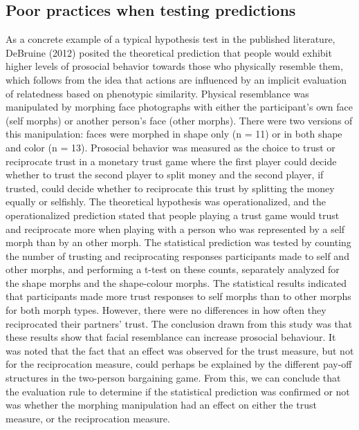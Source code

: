 \documentclass[doc,floatsintext]{apa6}
\begin{document}
\hypertarget{poor-practices-when-testing-predictions}{%
\subsection{Poor practices when testing predictions}\label{poor-practices-when-testing-predictions}}

As a concrete example of a typical hypothesis test in the published literature, DeBruine (2012) posited the theoretical prediction that people would exhibit higher levels of prosocial behavior towards those who physically resemble them, which follows from the idea that actions are influenced by an implicit evaluation of relatedness based on phenotypic similarity. Physical resemblance was manipulated by morphing face photographs with either the participant's own face (self morphs) or another person's face (other morphs). There were two versions of this manipulation: faces were morphed in shape only (n = 11) or in both shape and color (n = 13). Prosocial behavior was measured as the choice to trust or reciprocate trust in a monetary trust game where the first player could decide whether to trust the second player to split money and the second player, if trusted, could decide whether to reciprocate this trust by splitting the money equally or selfishly. The theoretical hypothesis was operationalized, and the operationalized prediction stated that people playing a trust game would trust and reciprocate more when playing with a person who was represented by a self morph than by an other morph. The statistical prediction was tested by counting the number of trusting and reciprocating responses participants made to self and other morphs, and performing a t-test on these counts, separately analyzed for the shape morphs and the shape-colour morphs. The statistical results indicated that participants made more trust responses to self morphs than to other morphs for both morph types. However, there were no differences in how often they reciprocated their partners' trust. The conclusion drawn from this study was that these results show that facial resemblance can increase prosocial behaviour. It was noted that the fact that an effect was observed for the trust measure, but not for the reciprocation measure, could perhaps be explained by the different pay-off structures in the two-person bargaining game. From this, we can conclude that the evaluation rule to determine if the statistical prediction was confirmed or not was whether the morphing manipulation had an effect on either the trust measure, or the reciprocation measure.
\end{document}
